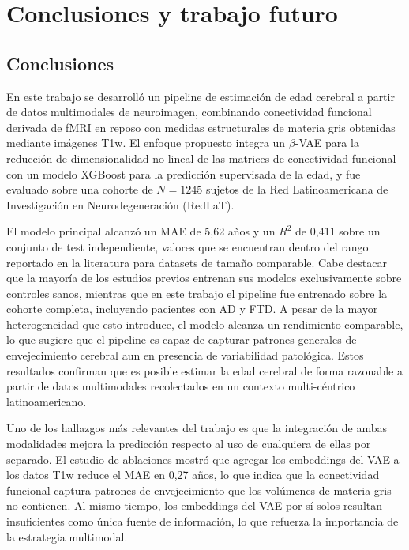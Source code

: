 \chapter{Conclusiones y trabajo futuro}
\label{chapter:conclu}

\section{Conclusiones}

En este trabajo se desarrolló un pipeline de estimación de edad cerebral a partir de datos multimodales de neuroimagen, combinando conectividad funcional derivada de fMRI en reposo con medidas estructurales de materia gris obtenidas mediante imágenes T1w. El enfoque propuesto integra un $\beta$-VAE para la reducción de dimensionalidad no lineal de las matrices de conectividad funcional con un modelo XGBoost para la predicción supervisada de la edad, y fue evaluado sobre una cohorte de $N = 1245$ sujetos de la Red Latinoamericana de Investigación en Neurodegeneración (RedLaT).

El modelo principal alcanzó un MAE de 5,62 años y un $R^2$ de 0,411 sobre un conjunto de test independiente, valores que se encuentran dentro del rango reportado en la literatura para datasets de tamaño comparable. Cabe destacar que la mayoría de los estudios previos entrenan sus modelos exclusivamente sobre controles sanos, mientras que en este trabajo el pipeline fue entrenado sobre la cohorte completa, incluyendo pacientes con AD y FTD. A pesar de la mayor heterogeneidad que esto introduce, el modelo alcanza un rendimiento comparable, lo que sugiere que el pipeline es capaz de capturar patrones generales de envejecimiento cerebral aun en presencia de variabilidad patológica. Estos resultados confirman que es posible estimar la edad cerebral de forma razonable a partir de datos multimodales recolectados en un contexto multi-céntrico latinoamericano.

Uno de los hallazgos más relevantes del trabajo es que la integración de ambas modalidades mejora la predicción respecto al uso de cualquiera de ellas por separado. El estudio de ablaciones mostró que agregar los embeddings del VAE a los datos T1w reduce el MAE en 0,27 años, lo que indica que la conectividad funcional captura patrones de envejecimiento que los volúmenes de materia gris no contienen. Al mismo tiempo, los embeddings del VAE por sí solos resultan insuficientes como única fuente de información, lo que refuerza la importancia de la estrategia multimodal.

